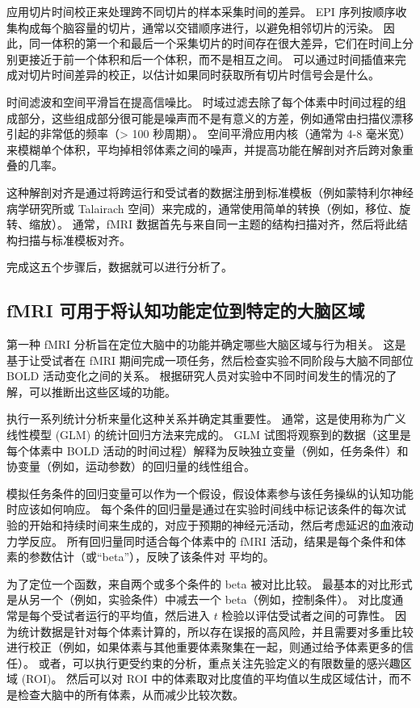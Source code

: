 应用切片时间校正来处理跨不同切片的样本采集时间的差异。 
EPI 序列按顺序收集构成每个脑容量的切片，通常以交错顺序进行，以避免相邻切片的污染。 
因此，同一体积的第一个和最后一个采集切片的时间存在很大差异，它们在时间上分别更接近于前一个体积和后一个体积，而不是相互之间。 
可以通过时间插值来完成对切片时间差异的校正，以估计如果同时获取所有切片时信号会是什么。


时间滤波和空间平滑旨在提高信噪比。 
时域过滤去除了每个体素中时间过程的组成部分，这些组成部分很可能是噪声而不是有意义的方差，例如通常由扫描仪漂移引起的非常低的频率（> 100 秒周期）。 
空间平滑应用内核（通常为 4-8 毫米宽）来模糊单个体积，平均掉相邻体素之间的噪声，并提高功能在解剖对齐后跨对象重叠的几率。

这种解剖对齐是通过将跨运行和受试者的数据注册到标准模板（例如蒙特利尔神经病学研究所或 Talairach 空间）来完成的，通常使用简单的转换（例如，移位、旋转、缩放）。 
通常，fMRI 数据首先与来自同一主题的结构扫描对齐，然后将此结构扫描与标准模板对齐。

完成这五个步骤后，数据就可以进行分析了。


\subsection{fMRI 可用于将认知功能定位到特定的大脑区域}
第一种 fMRI 分析旨在定位大脑中的功能并确定哪些大脑区域与行为相关。 
这是基于让受试者在 fMRI 期间完成一项任务，然后检查实验不同阶段与大脑不同部位 BOLD 活动变化之间的关系。 
根据研究人员对实验中不同时间发生的情况的了解，可以推断出这些区域的功能。


执行一系列统计分析来量化这种关系并确定其重要性。 
通常，这是使用称为广义线性模型 (GLM) 的统计回归方法来完成的。 
GLM 试图将观察到的数据（这里是每个体素中 BOLD 活动的时间过程）解释为反映独立变量（例如，任务条件）和协变量（例如，运动参数）的回归量的线性组合。


模拟任务条件的回归变量可以作为一个假设，假设体素参与该任务操纵的认知功能时应该如何响应。 
每个条件的回归量是通过在实验时间线中标记该条件的每次试验的开始和持续时间来生成的，对应于预期的神经元活动，然后考虑延迟的血液动力学反应。 
所有回归量同时适合每个体素中的 fMRI 活动，结果是每个条件和体素的参数估计（或“beta”），反映了该条件对 平均的。


为了定位一个函数，来自两个或多个条件的 beta 被对比比较。 
最基本的对比形式是从另一个（例如，实验条件）中减去一个 beta（例如，控制条件）。 
对比度通常是每个受试者运行的平均值，然后进入 $t$ 检验以评估受试者之间的可靠性。 
因为统计数据是针对每个体素计算的，所以存在误报的高风险，并且需要对多重比较进行校正（例如，如果体素与其他重要体素聚集在一起，则通过给予体素更多的信任）。 
或者，可以执行更受约束的分析，重点关注先验定义的有限数量的感兴趣区域 (ROI)。 
然后可以对 ROI 中的体素取对比度值的平均值以生成区域估计，而不是检查大脑中的所有体素，从而减少比较次数。


